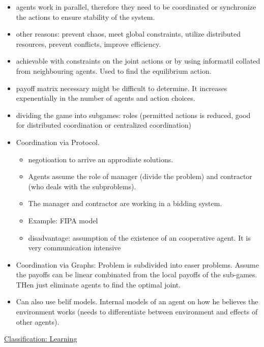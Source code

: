 \begin{itemize}[noitemsep,nolistsep]
	\item agents work in parallel, therefore they need to be coordinated or synchronize the actions to ensure stability of the system.
	\item other reasons: prevent chaos, meet global constraints, utilize distributed resources, prevent conflicts, improve efficiency.
	\item achievable with constraints on the joint actions or by using informatil collated from neighbouring agents. Used to find the equilibrium action.
	\item payoff matrix necessary might be difficult to determine. It increases expenentially in the number of agents and action choices.
	\item dividing the game into subgames: roles (permitted actions is reduced, good for distributed coordination or centralized coordination)
	\item Coordination via Protocol.
	\begin{itemize}[noitemsep,nolistsep]
		\item negotioation to arrive an approdiate solutions.
		\item Agents assume the role of manager (divide the problem) and contractor (who deals with the subproblems).
		\item The manager and contractor are working in a bidding system.
		\item Example: FIPA model
		\item disadvantage: assumption of the existence of an cooperative agent. It is very communication intensive
	\end{itemize}
	\item Coordination via Graphs: Problem is subdivided into easer problems. Assume the payoffs can be linear combinated from the local payoffs of the sub-games. THen just eliminate agents to find the optimal joint.
	\item Can also use belif models. Internal models of an agent on how he believes the environment works (needs to differentiate between environment and effects of other agents).
\end{itemize}
\underline{Classification: Learning}

